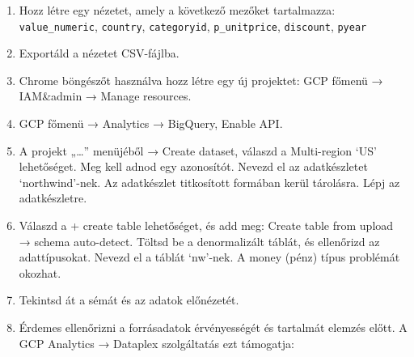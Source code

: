 \documentclass[
  magyar,
]{article}
\begin{document}
\begin{enumerate}
\def\labelenumi{\arabic{enumi}.}
\item
  Hozz létre egy nézetet, amely a következő mezőket tartalmazza:
  \texttt{value\_numeric}, \texttt{country}, \texttt{categoryid},
  \texttt{p\_unitprice}, \texttt{discount}, \texttt{pyear}
\item
  Exportáld a nézetet CSV-fájlba.
\item
  Chrome böngészőt használva hozz létre egy új projektet: GCP főmenü →
  IAM\&admin → Manage resources.
\item
  GCP főmenü → Analytics → BigQuery, Enable API.
\item
  A projekt „\ldots'' menüjéből → Create dataset, válaszd a Multi-region
  `US' lehetőséget. Meg kell adnod egy azonosítót. Nevezd el az
  adatkészletet `northwind'-nek. Az adatkészlet titkosított formában
  kerül tárolásra. Lépj az adatkészletre.
\item
  Válaszd a + create table lehetőséget, és add meg: Create table from
  upload → schema auto-detect. Töltsd be a denormalizált táblát, és
  ellenőrizd az adattípusokat. Nevezd el a táblát `nw'-nek. A money
  (pénz) típus problémát okozhat.
\item
  Tekintsd át a sémát és az adatok előnézetét.
\item
  Érdemes ellenőrizni a forrásadatok érvényességét és tartalmát elemzés
  előtt. A GCP Analytics → Dataplex szolgáltatás ezt támogatja:


\end{enumerate}
\end{document}
